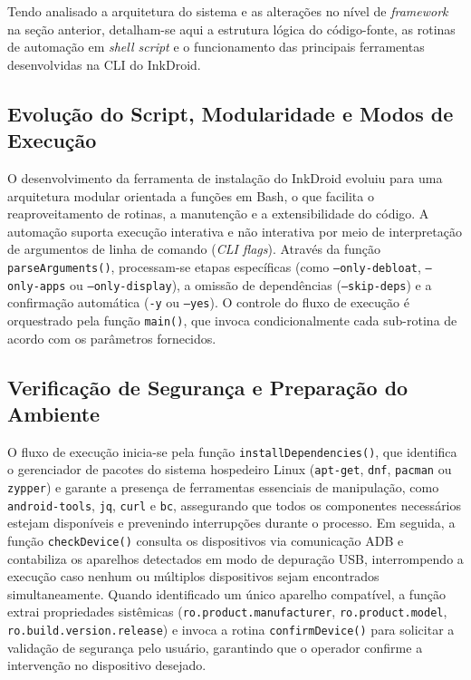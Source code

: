 \documentclass[
    12pt,
    openright,
    oneside,
    a4paper,
    english,
    brazilian
    ]{abntex2}
\begin{document}
Tendo analisado a arquitetura do sistema e as alterações no nível de \textit{framework} na seção anterior, detalham-se aqui a estrutura lógica do código-fonte, as rotinas de automação em \textit{shell script} e o funcionamento das principais ferramentas desenvolvidas na CLI do InkDroid.

\subsection{Evolução do Script, Modularidade e Modos de Execução}

O desenvolvimento da ferramenta de instalação do InkDroid evoluiu para uma arquitetura modular orientada a funções em Bash, o que facilita o reaproveitamento de rotinas, a manutenção e a extensibilidade do código. A automação suporta execução interativa e não interativa por meio de interpretação de argumentos de linha de comando (\textit{CLI flags}). Através da função \texttt{parseArguments()}, processam-se etapas específicas (como \texttt{--only-debloat}, \texttt{--only-apps} ou \texttt{--only-display}), a omissão de dependências (\texttt{--skip-deps}) e a confirmação automática (\texttt{-y} ou \texttt{--yes}). O controle do fluxo de execução é orquestrado pela função \texttt{main()}, que invoca condicionalmente cada sub-rotina de acordo com os parâmetros fornecidos.

\subsection{Verificação de Segurança e Preparação do Ambiente}

O fluxo de execução inicia-se pela função \texttt{installDependencies()}, que identifica o gerenciador de pacotes do sistema hospedeiro Linux (\texttt{apt-get}, \texttt{dnf}, \texttt{pacman} ou \texttt{zypper}) e garante a presença de ferramentas essenciais de manipulação, como \texttt{android-tools}, \texttt{jq}, \texttt{curl} e \texttt{bc}, assegurando que todos os componentes necessários estejam disponíveis e prevenindo interrupções durante o processo. Em seguida, a função \texttt{checkDevice()} consulta os dispositivos via comunicação ADB e contabiliza os aparelhos detectados em modo de depuração USB, interrompendo a execução caso nenhum ou múltiplos dispositivos sejam encontrados simultaneamente. Quando identificado um único aparelho compatível, a função extrai propriedades sistêmicas (\texttt{ro.product.manufacturer}, \texttt{ro.product.model}, \texttt{ro.build.version.release}) e invoca a rotina \texttt{confirmDevice()} para solicitar a validação de segurança pelo usuário, garantindo que o operador confirme a intervenção no dispositivo desejado.
\end{document}
